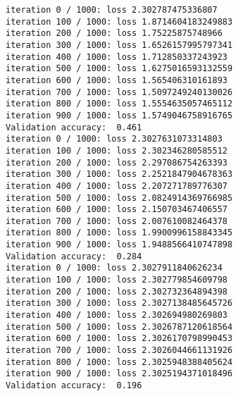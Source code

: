 \documentclass[11pt]{article}
\begin{document}
    \begin{Verbatim}[commandchars=\\\{\}]
iteration 0 / 1000: loss 2.302787475336807
iteration 100 / 1000: loss 1.8714604183249883
iteration 200 / 1000: loss 1.75225875748966
iteration 300 / 1000: loss 1.6526157995797341
iteration 400 / 1000: loss 1.712850337243923
iteration 500 / 1000: loss 1.6275016593132559
iteration 600 / 1000: loss 1.565406310161893
iteration 700 / 1000: loss 1.5097249240130026
iteration 800 / 1000: loss 1.5554635057465112
iteration 900 / 1000: loss 1.5749046758916765
Validation accuracy:  0.461
iteration 0 / 1000: loss 2.3027631073314803
iteration 100 / 1000: loss 2.302346280585512
iteration 200 / 1000: loss 2.297086754263393
iteration 300 / 1000: loss 2.2521847904678363
iteration 400 / 1000: loss 2.207271789776307
iteration 500 / 1000: loss 2.0824914369766985
iteration 600 / 1000: loss 2.150703467406557
iteration 700 / 1000: loss 2.007610082464378
iteration 800 / 1000: loss 1.9900996158843345
iteration 900 / 1000: loss 1.9488566410747898
Validation accuracy:  0.284
iteration 0 / 1000: loss 2.3027911840626234
iteration 100 / 1000: loss 2.302779854609798
iteration 200 / 1000: loss 2.302732364894398
iteration 300 / 1000: loss 2.3027138485645726
iteration 400 / 1000: loss 2.302694980269803
iteration 500 / 1000: loss 2.3026787120618564
iteration 600 / 1000: loss 2.3026170798990453
iteration 700 / 1000: loss 2.3026044661131926
iteration 800 / 1000: loss 2.3025948388405624
iteration 900 / 1000: loss 2.3025194371018496
Validation accuracy:  0.196

    \end{Verbatim}
\end{document}

